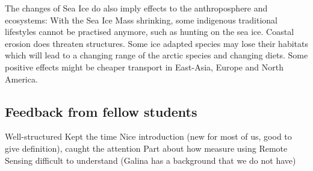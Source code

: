 The changes of Sea Ice do also imply effects to the anthroposphere and ecosystems:
With the Sea Ice Mass shrinking, some indigenous traditional lifestyles cannot be practised anymore, such as hunting on the sea ice. Coastal erosion does threaten structures. Some ice adapted species may lose their habitats which will lead to a changing range of the arctic species and changing diets. Some positive effects might be cheaper transport in East-Asia, Europe and North America.




\subsection{Feedback from fellow students}
Well-structured Kept the time Nice introduction (new for most of us, good to give definition), caught the attention Part about how measure using Remote Sensing difficult to understand (Galina has a background that we do not have)
